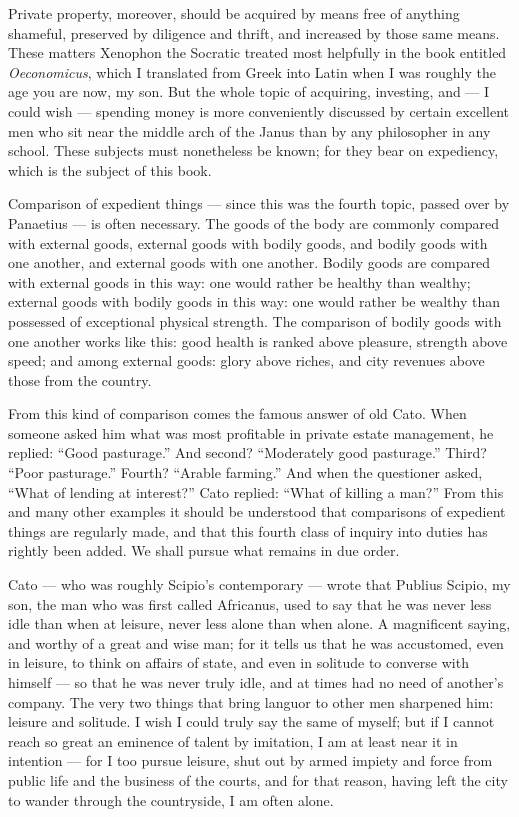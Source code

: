  Private property, moreover, should be acquired by means free of anything shameful, preserved by diligence and thrift, and increased by those same means. These matters Xenophon the Socratic treated most helpfully in the book entitled \textit{Oeconomicus}, which I translated from Greek into Latin when I was roughly the age you are now, my son. But the whole topic of acquiring, investing, and — I could wish — spending money is more conveniently discussed by certain excellent men who sit near the middle arch of the Janus than by any philosopher in any school. These subjects must nonetheless be known; for they bear on expediency, which is the subject of this book.

 Comparison of expedient things — since this was the fourth topic, passed over by Panaetius — is often necessary. The goods of the body are commonly compared with external goods, external goods with bodily goods, and bodily goods with one another, and external goods with one another. Bodily goods are compared with external goods in this way: one would rather be healthy than wealthy; external goods with bodily goods in this way: one would rather be wealthy than possessed of exceptional physical strength. The comparison of bodily goods with one another works like this: good health is ranked above pleasure, strength above speed; and among external goods: glory above riches, and city revenues above those from the country.

 From this kind of comparison comes the famous answer of old Cato. When someone asked him what was most profitable in private estate management, he replied: ``Good pasturage.'' And second? ``Moderately good pasturage.'' Third? ``Poor pasturage.'' Fourth? ``Arable farming.'' And when the questioner asked, ``What of lending at interest?'' Cato replied: ``What of killing a man?'' From this and many other examples it should be understood that comparisons of expedient things are regularly made, and that this fourth class of inquiry into duties has rightly been added. We shall pursue what remains in due order.


 Cato — who was roughly Scipio's contemporary — wrote that Publius Scipio, my son, the man who was first called Africanus, used to say that he was never less idle than when at leisure, never less alone than when alone. A magnificent saying, and worthy of a great and wise man; for it tells us that he was accustomed, even in leisure, to think on affairs of state, and even in solitude to converse with himself — so that he was never truly idle, and at times had no need of another's company. The very two things that bring languor to other men sharpened him: leisure and solitude. I wish I could truly say the same of myself; but if I cannot reach so great an eminence of talent by imitation, I am at least near it in intention — for I too pursue leisure, shut out by armed impiety and force from public life and the business of the courts, and for that reason, having left the city to wander through the countryside, I am often alone.

